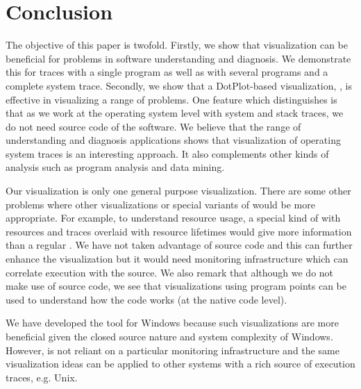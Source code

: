 \section{Conclusion}
\label{sec:conclusion}

The objective of this paper is twofold.
Firstly, we show that visualization can be beneficial for problems
in software understanding and diagnosis. We demonstrate this
for traces with a single program as well as with
several programs and a complete system trace.
Secondly, we show that a DotPlot-based visualization, \VDP{}, is effective
in visualizing a range of problems.
One feature which distinguishes \lviz{} is that as we work
at the operating system level with system and stack traces, 
we do not need source code of the software.
We believe that the range of understanding and diagnosis applications
shows that visualization of operating system traces is an interesting approach.
It also complements other kinds of analysis such
as program analysis and data mining.

Our \VDP{} visualization is only one general purpose visualization.
There are some other problems where other visualizations \cite{dep-icse} or special
variants of \VDP{} would be more appropriate. For example, to understand
resource usage, a special kind of \VDP{} with resources and traces overlaid
with resource lifetimes would give more information than a regular \VDP{}.
We have not taken advantage of source code and this can further enhance
the visualization but it would need monitoring infrastructure which
can correlate execution with the source.
We also remark that although we do not make use of source code, we
see that visualizations using program points can be used to understand 
how the code works (at the native code level).

We have developed the \VDP{} tool for Windows because such visualizations
are more beneficial given the closed source nature and system complexity
of Windows. 
However, \VDP{} is not reliant on a particular monitoring 
infrastructure and the same visualization ideas can be applied
to other systems with a rich source of execution traces, e.g. Unix.
